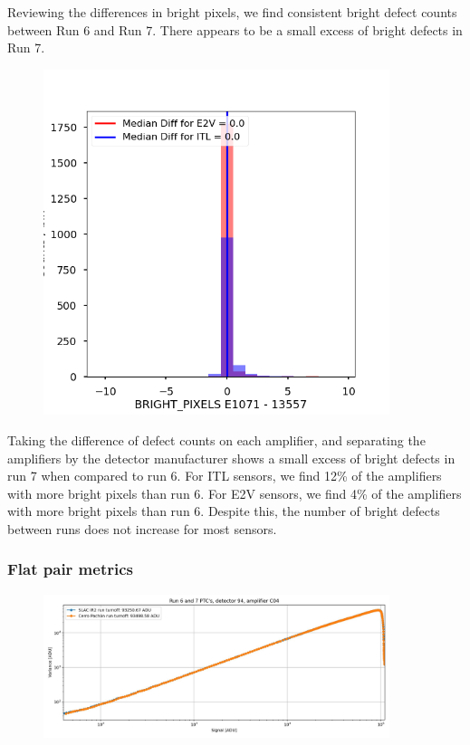 Reviewing the differences in bright pixels, we find consistent bright
defect counts between Run 6 and Run 7. There appears to be a small
excess of bright defects in Run 7.

\begin{figure}
\begin{centering}
\includegraphics[width=0.9\textwidth]{sections/figures/baselineCharacterization/BRIGHT_PIXELS_13557_E1071_diff.png}
\end{centering}
\end{figure}

Taking the difference of defect counts on each amplifier, and separating
the amplifiers by the detector manufacturer shows a small excess of
bright defects in run 7 when compared to run 6. For ITL sensors, we find
12\% of the amplifiers with more bright pixels than run 6. For E2V
sensors, we find 4\% of the amplifiers with more bright pixels than run
6. Despite this, the number of bright defects between runs does not
increase for most sensors.

\subsubsection{Flat pair metrics}\label{flat-pair-metrics}

\begin{figure}
\begin{centering}
\includegraphics[width=0.9\textwidth]{sections/figures/baselineCharacterization/run7PTCsToDate.jpg}
\end{centering}
\end{figure}

